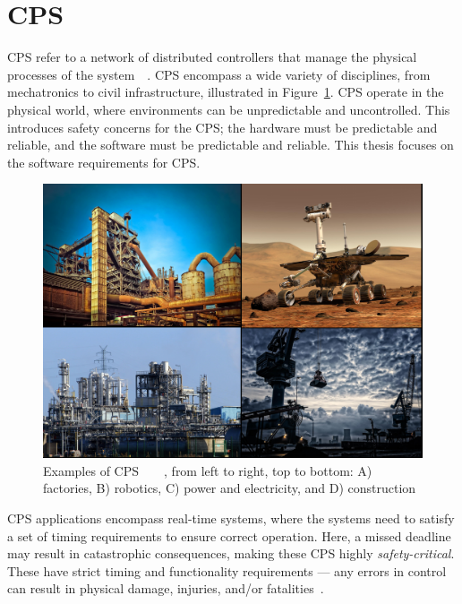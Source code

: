 \section{\acf{CPS}}
\acf{CPS} refer to a network of distributed controllers that manage the physical processes of the system~\cite{cps-design}~\cite{alur2015principles}. 
\ac{CPS} encompass a wide variety of disciplines, from mechatronics to civil infrastructure, illustrated in Figure~\ref{fig:cps}.
\ac{CPS} operate in the physical world, where environments can be unpredictable and uncontrolled.
This introduces safety concerns for the \ac{CPS}; the hardware must be predictable and reliable, and the software must be predictable and reliable.
This thesis focuses on the software requirements for \ac{CPS}.

\begin{figure}[h]
	\centering
	\includegraphics[width=\textwidth]{Content/fig/1234.pdf}
	\caption{Examples of \ac{CPS}~\cite{industry-pic}~\cite{crane-pic}~\cite{rover-pic}~\cite{factory-pic}, from left to right, top to bottom: A) factories, B) robotics, C) power and electricity, and D) construction \label{fig:cps}}
\end{figure}

\ac{CPS} applications encompass real-time systems, where the systems need to satisfy a set of timing requirements to ensure correct operation. 
Here, a missed deadline may result in catastrophic consequences, making these \ac{CPS} highly \textit{safety-critical}. 
These have strict timing and functionality requirements --- any errors in control can result in physical damage, injuries, and/or fatalities~\cite{ANNDevModel1999}. 


